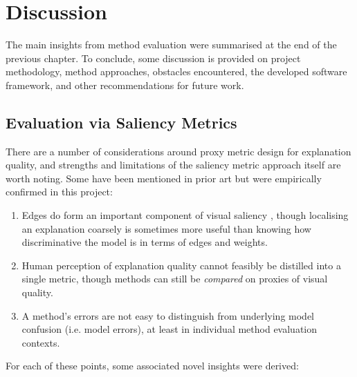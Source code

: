 \documentclass[main]{subfiles}
\begin{document}
\chapter{Discussion}

The main insights from method evaluation were summarised at the end of the previous chapter. To conclude, some discussion is provided on project methodology, method approaches, obstacles encountered, the developed software framework, and other recommendations for future work.

\section{Evaluation via Saliency Metrics} \label{sec:eval_via_metrics}

There are a number of considerations around proxy metric design for explanation quality, and strengths and limitations of the saliency metric approach itself are worth noting. Some have been mentioned in prior art but were empirically confirmed in this project:
\begin{enumerate}
\item Edges do form an important component of visual saliency \cite{sanity}, though localising an explanation coarsely is sometimes more useful than knowing how discriminative the model is in terms of edges and weights.
\item Human perception of explanation quality cannot feasibly be distilled into a single metric, though methods can still be \textit{compared} on proxies of visual quality.
\item A method's errors are not easy to distinguish from underlying model confusion (i.e. model errors), at least in individual method evaluation contexts.

\end{enumerate}

\noindent For each of these points, some associated novel insights were derived:
\end{document}
